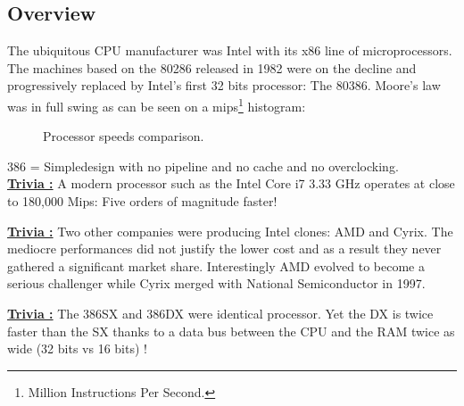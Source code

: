 \documentclass[book.tex]{subfiles}
\begin{document}
  \subsection{Overview}
  The ubiquitous CPU manufacturer was Intel with its x86 line of microprocessors.  The machines based on the 80286 released in 1982 were on the decline and progressively replaced by Intel's first 32 bits processor: The 80386. Moore's law was in full swing as can be seen on a mips\footnote{Million Instructions Per Second.} histogram:


\begin{figure}[H]
\centering
   \caption{Processor speeds comparison.} \label{fig:mips}
 \end{figure}
386 = Simpledesign with no pipeline and no cache and no overclocking.\\
 \textbf{\underline{Trivia :}} A modern processor such as the Intel Core i7 3.33 GHz operates at close to 180,000 Mips: Five orders of magnitude faster!

 \bigskip

\textbf{\underline{Trivia :}}  Two other companies were producing Intel clones: AMD and Cyrix. The mediocre performances did not justify the lower cost and as a result they never gathered a significant market share. Interestingly AMD evolved to become a serious challenger while Cyrix merged with National Semiconductor in 1997.

 \bigskip
 
 \textbf{\underline{Trivia :}} The 386SX and 386DX were identical processor. Yet the DX is twice faster than the SX thanks to a data bus between the CPU and the RAM twice as wide (32 bits vs 16 bits) !
\end{document}
